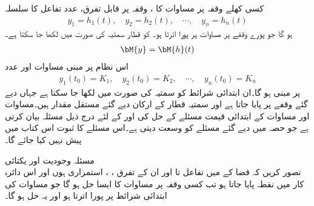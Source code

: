 کسی کھلے وقفہ  پر مساوات  کا ، وقفہ  پر قابل تفرق،  عدد  تفاعل کا سلسلہ
\begin{align*}
y_1=h_1(t),\quad y_2=h_2(t),\quad \cdots, \quad y_n=h_n(t)
\end{align*}
ہو گا جو  پورے  وقفے پر مساوات  پر پورا اترتا ہو۔ کو قطار سمتیہ  کی صورت میں لکھا جا سکتا ہے۔
\begin{align*}
\bM{y}=\bM{h}(t)
\end{align*}
اس نظام پر مبنی  مساوات  اور   عدد  
\begin{align}\label{مساوات_نظام_عمومی_ب}
y_1(t_0)=K_1, \quad y_2(t_0)=K_2,\quad \cdots,\quad y_n(t_0)=K_n
\end{align}
پر مبنی ہو گا۔ان ابتدائی شرائط کو سمتیہ کی صورت میں  لکھا جا سکتا ہے جہاں  دیے گئے وقفے پر پایا جاتا ہے اور سمتیہ قطار  کے ارکان دیے گئے مستقل مقدار ہیں۔مساوات  اور مساوات  کے ابتدائی قیمت مسئلے کے حل کی  اور  کے لئے  درج ذیل مسئلہ بیان کرتی ہے جو حصہ  میں دیے گئے مسئلے کو وسعت دیتی ہے۔اس مسئلے کا ثبوت اس کتاب میں پیش نہیں کیا جائے گا۔

\quad مسئلہ وجودیت اور یکتائی \\
تصور کریں کہ فضا  کے   میں  تفاعل  تا  اور ان کے تفرق ،   ،   استمراری ہوں اور اس دائرہ کار میں نقطہ  پایا جاتا ہو تب کسی وقفہ  پر مساوات  کا ایسا حل  ہو گا جو مساوات  کی ابتدائی شرائط پر پورا اترتا ہو اور  یہ حل  ہو گا۔

